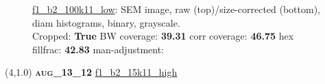 \begin{figure}[h!]
\label{semimg11}
\caption*{\hyperlink{covtableaug_13_12}{\color{blue} \small \ttfamily f1\_b2\_100k11\_low}: SEM image, raw (top)/size-corrected (bottom), diam histograms, binary, grayscale.\\Cropped: {\bf True} \;\; BW coverage: {\bf 39.31} \:\: corr coverage: {\bf 46.75} \:\: hex fillfrac: {\bf 42.83} \:\: man-adjustment: {\bf \color{blue}{Yes}}}
\end{figure}
\newpage

\begin{textblock}{5}(4,1.0)
{\bf \textsc{aug\_13\_12}}
\hspace{4.5cm}
\hyperlink{covtableaug_13_12}{\color{blue} \large \ttfamily f1\_b2\_15k11\_high}
\end{textblock}

